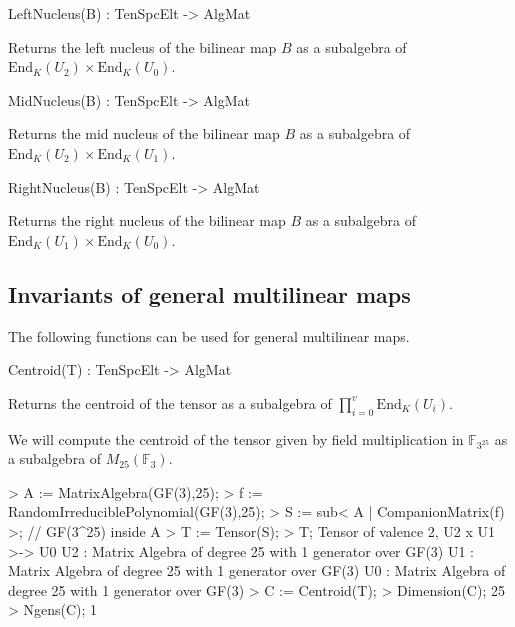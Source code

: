 \begin{intrinsics}
LeftNucleus(B) : TenSpcElt -> AlgMat
\end{intrinsics}

Returns the left nucleus of the bilinear map $B$ as a subalgebra of $\text{End}_K(U_2)\times \text{End}_K(U_0)$.

\begin{intrinsics}
MidNucleus(B) : TenSpcElt -> AlgMat
\end{intrinsics}

Returns the mid nucleus of the bilinear map $B$ as a subalgebra of $\text{End}_K(U_2)\times \text{End}_K(U_1)$.

\begin{intrinsics}
RightNucleus(B) : TenSpcElt -> AlgMat
\end{intrinsics}

Returns the right nucleus of the bilinear map $B$ as a subalgebra of $\text{End}_K(U_1)\times \text{End}_K(U_0)$.

\subsection{Invariants of general multilinear maps}

The following functions can be used for general multilinear maps.

\begin{intrinsics}
Centroid(T) : TenSpcElt -> AlgMat
\end{intrinsics}

Returns the centroid of the tensor as a subalgebra of $\prod_{i=0}^v\text{End}_K(U_i)$.

\begin{example}
We will compute the centroid of the tensor given by field multiplication in $\mathbb{F}_{3^{25}}$ as a subalgebra of $M_{25}(\mathbb{F}_3)$.

\begin{code}
> A := MatrixAlgebra(GF(3),25);
> f := RandomIrreduciblePolynomial(GF(3),25);
> S := sub< A | CompanionMatrix(f) >; // GF(3^25) inside A
> T := Tensor(S);
> T;
Tensor of valence 2, U2 x U1 >-> U0
U2 : Matrix Algebra of degree 25 with 1 generator over GF(3)
U1 : Matrix Algebra of degree 25 with 1 generator over GF(3)
U0 : Matrix Algebra of degree 25 with 1 generator over GF(3)
> C := Centroid(T);
> Dimension(C);
25
> Ngens(C);
1
\end{code}
\end{example}

